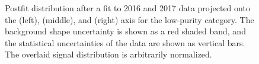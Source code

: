 \begin{figure}[h!]
\caption{Postfit distribution after a fit to 2016 and 2017 data projected onto the \MJO (left), \MJT (middle), and \MVV (right) axis for the low-purity category. The background shape uncertainty is shown as a red shaded band, and the statistical uncertainties of the data are shown as vertical bars. The overlaid signal distribution is arbitrarily normalized.}
\label{fig:searchIII:finalPostFitLP}
\end{figure}
\clearpage

